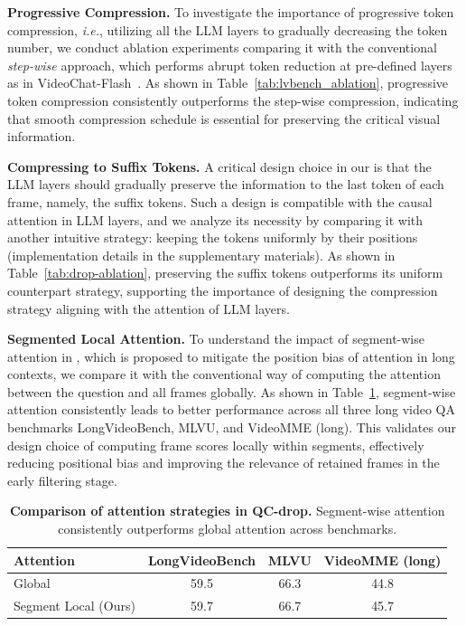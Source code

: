 \textbf{Progressive Compression.}\;\;  To investigate the importance of progressive token compression, \emph{i.e.}, utilizing all the LLM layers to gradually decreasing the token number, we conduct ablation experiments comparing it with the conventional \textit{step-wise} approach, which performs abrupt token reduction at pre-defined layers as in VideoChat-Flash~\cite{li2024videochat}. As shown in Table~\ref{tab:lvbench_ablation}, progressive token compression consistently outperforms the step-wise compression, indicating that smooth compression schedule is essential for preserving the critical visual information.






\noindent
\textbf{Compressing to Suffix Tokens.}\;\; 
A critical design choice in our \drop is that the LLM layers should gradually preserve the information to the last token of each frame, namely, the suffix tokens. Such a design is compatible with the causal attention in LLM layers, and we analyze its necessity by comparing it with another intuitive strategy: keeping the tokens uniformly by their positions (implementation details in the supplementary materials).  As shown in Table~\ref{tab:drop-ablation}, preserving the suffix tokens outperforms its uniform counterpart strategy, supporting the importance of designing the compression strategy aligning with the attention of LLM layers.



\noindent \textbf{Segmented Local Attention.}\;\;  To understand the impact of segment-wise attention in \segment, which is proposed to mitigate the position bias of attention in long contexts, we compare it with the conventional way of computing the attention between the question and all frames globally. 
As shown in Table~\ref{tab:segment_vs_global}, segment-wise attention consistently leads to better performance across all three long video QA benchmarks LongVideoBench, MLVU, and VideoMME (long). This validates our design choice of computing frame scores locally within segments, effectively reducing positional bias and improving the relevance of retained frames in the early filtering stage.

\begin{table}[H]
\centering
\vspace{-1.0em}
\caption{\textbf{Comparison of attention strategies in QC-drop.} Segment-wise attention consistently outperforms global attention across benchmarks.}
\label{tab:segment_vs_global}
\begin{tabular}{l|ccc}
\toprule
Attention & LongVideoBench & MLVU & VideoMME (long) \\
\midrule
Global & 59.5 & 66.3 & 44.8 \\
Segment Local (Ours) & 59.7 & 66.7 & 45.7 \\
\bottomrule
\end{tabular}
\vspace{-0.6em}
\end{table}



